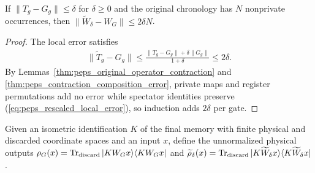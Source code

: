 \begin{lemma}
    \label{thm:peps_approximate_chronological_error}
    \leanok
    If $\|T_g-G_g\|\le\delta$ for $\delta\ge0$ and the original chronology has
    $N$ nonprivate occurrences, then $\|\widetilde W_\delta-W_G\|\le2\delta N$.
\end{lemma}
\begin{proof}
    \leanok
    The local error satisfies
    \begin{align}
        \|\widetilde T_g-G_g\|
        \le \frac{\|T_g-G_g\|+\delta\|G_g\|}{1+\delta}
        \le2\delta.
        \label{eq:peps_rescaled_local_error}
    \end{align}
    By Lemmas~\ref{thm:peps_original_operator_contraction} and
    \ref{thm:peps_contraction_composition_error}, private maps and register
    permutations add no error while spectator identities preserve
    (\ref{eq:peps_rescaled_local_error}), so induction adds $2\delta$ per gate.
\end{proof}

\begin{definition}
    \label{def:peps_original_gate_density}
    \leanok
    Given an isometric identification $K$ of the final memory with
    finite physical and discarded coordinate spaces and an input $x$, define
    the unnormalized physical outputs
    $\rho_G(x)=\operatorname{Tr}_{\rm discard}|KW_Gx\rangle\langle KW_Gx|$
    and $\widetilde\rho_\delta(x)=\operatorname{Tr}_{\rm discard}|K\widetilde W_\delta x\rangle\langle K\widetilde W_\delta x|$.
\end{definition}

